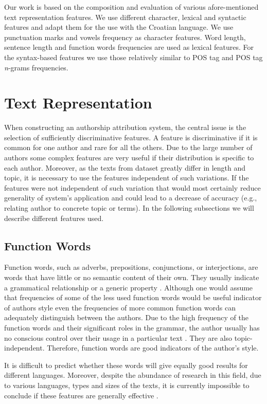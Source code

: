 \documentclass{llncs}
\begin{document}
Our work is based on the composition and evaluation of various afore-mentioned
text representation features. We use different character, lexical and syntactic
features and adapt them for the use with the Croatian language. We use
punctuation marks and vowels frequency as character features. Word length,
sentence length and function words frequencies are used as lexical features. For
the syntax-based features we use those relatively similar to POS tag and POS tag
\emph{n}-grams frequencies.


\section{Text Representation}
When constructing an authorship attribution system, the central issue is the
selection of sufficiently discriminative features. A feature is discriminative if
it is common for one author and rare for all the others. Due to the large number
of authors some complex features are very useful if their distribution is
specific to each author. Moreover, as the texts from dataset greatly differ in
length and topic, it is necessary to use the features independent of such
variations. If the features were not independent of such variation that
would most certainly reduce generality of system's application and could lead
to a decrease of accuracy (e.g., relating author to concrete topic or terms). In the following subsections we will describe different features used.

\subsection{Function Words}
\label{sec:funkcijske-rijeci}
Function words, such as adverbs, prepositions, conjunctions, or interjections,
are words that have little or no semantic content of their own. They usually
indicate a grammatical relationship or a generic property
\cite{zhao2005effective}. Although one would assume that frequencies of some of
the less used function words would be useful indicator of authors style even the
frequencies of more common function words can adequately distinguish between the
authors. Due to the high frequency of the function words and their significant
roles in the grammar, the author usually has no conscious control over their
usage in a particular text \cite{argamon2005measuring}. They are also
topic-independent. Therefore, function words are good indicators of the author's
style.

It is difficult to predict whether these words will give equally good results for
different languages. Moreover, despite the abundance of research in this field,
due to various languages, types and sizes of the texts, it is currently
impossible to conclude if these features are generally effective
\cite{zhao2005effective}.
\end{document}

